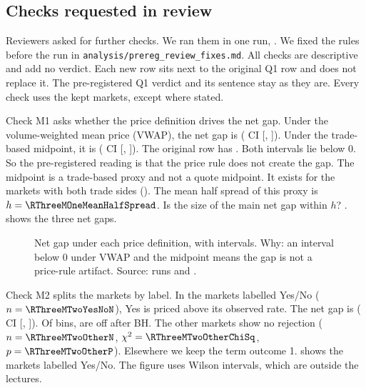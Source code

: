 \subsection{Checks requested in review}\label{sec:res-review}
Reviewers asked for further checks.
We ran them in one run, \RThreeRun.
We fixed the rules before the run in \texttt{analysis/prereg\_review\_fixes.md}.
All checks are descriptive and add no verdict.
Each new row sits next to the original Q1 row and does not replace it.
The pre-registered Q1 verdict and its sentence stay as they are.
Every check uses the \QOneN{} kept markets, except where stated.

Check M1 asks whether the price definition drives the net gap.
Under the volume-weighted mean price (VWAP), the net gap is \RThreeMOneVwapNetGap{} (\CiLevel{} CI [\RThreeMOneVwapNetGapCiLow, \RThreeMOneVwapNetGapCiHigh]).
Under the trade-based midpoint, it is \RThreeMOneMidNetGap{} (\CiLevel{} CI [\RThreeMOneMidNetGapCiLow, \RThreeMOneMidNetGapCiHigh]).
The original row has \GapNetDiffMain.
Both intervals lie below 0.
So the pre-registered reading is that the price rule does not create the gap.
The midpoint is a trade-based proxy and not a quote midpoint.
It exists for the \RThreeMOneMidN{} markets with both trade sides (\RThreeMOneShareBoth).
The mean half spread of this proxy is $h=\RThreeMOneMeanHalfSpread$.
Is the size of the main net gap within $h$? \RThreeMOneGapWithinHalfSpread.
 shows the three net gaps.

\begin{figure}[H]
\centering
{}
\caption{Net gap under each price definition, with \CiLevel{} intervals. Why: an interval below 0 under VWAP and the midpoint means the gap is not a price-rule artifact. Source: runs \RThreeRun{} and \RThreeFigRun.}
\label{fig:r3-m1}
\end{figure}

Check M2 splits the markets by label.
In the markets labelled Yes/No ($n=\RThreeMTwoYesNoN$), Yes is priced above its observed rate.
The net gap is \RThreeMTwoYesNoNetGap{} (\CiLevel{} CI [\RThreeMTwoYesNoNetGapCiLow, \RThreeMTwoYesNoNetGapCiHigh]).
Of \NBins{} bins, \RThreeMTwoYesNoBinsBh{} are off after BH.
The other markets show no rejection ($n=\RThreeMTwoOtherN$, $\chi^2=\RThreeMTwoOtherChiSq$, $p=\RThreeMTwoOtherP$).
Elsewhere we keep the term outcome 1.
 shows the markets labelled Yes/No.
The figure uses Wilson intervals, which are outside the lectures.

